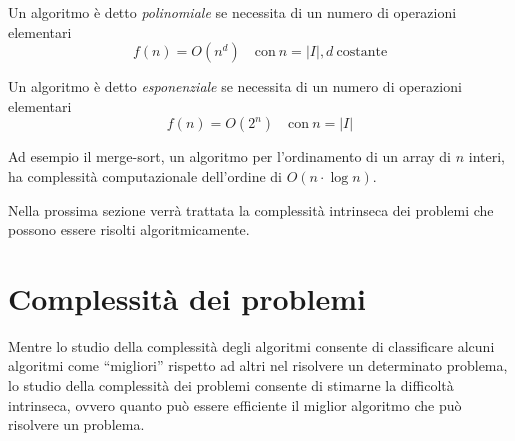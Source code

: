 Un algoritmo è detto \emph{polinomiale} se necessita di un numero di operazioni elementari
\begin{displaymath}
 f(n) = O(n^d) \quad \text{con}\  n = \vert I \vert, d\  \text{costante}
\end{displaymath}

Un algoritmo è detto \emph{esponenziale} se necessita di un numero di operazioni 
elementari
\begin{displaymath}
 f(n) = O(2^n) \quad \text{con}\ n = \vert I \vert
\end{displaymath}

Ad esempio il merge-sort, un algoritmo per l'ordinamento di un array di $n$ interi, ha 
complessità computazionale dell'ordine di $O(n\cdot \log n)$.

Nella prossima sezione verrà trattata la complessità intrinseca dei problemi che possono 
essere risolti algoritmicamente.

\section{Complessità dei problemi}
\label{sec:complessitaProblemi}
Mentre lo studio della complessità degli algoritmi consente di classificare alcuni 
algoritmi come ``migliori'' rispetto ad altri nel risolvere un determinato problema, lo 
studio della complessità dei problemi consente di stimarne la difficoltà intrinseca, 
ovvero quanto può essere efficiente il miglior algoritmo che può risolvere un problema.
